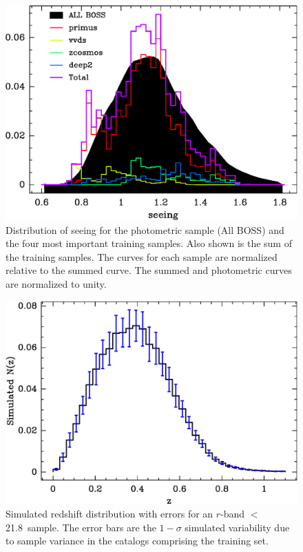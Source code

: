 \documentclass[preprint]{aastex}
\newcommand{\rmax}{21.8}
\begin{document}
\begin{figure}[h]\centering
    \includegraphics[scale=0.7]{figures/primus-vvds-zcosmos-deep2-match-seeing-10.eps}

    \caption{Distribution of seeing for the photometric sample (All BOSS) and
    the four most important training samples.  Also shown is the sum of the
    training samples.  The curves for each sample are normalized relative to
    the summed curve.  The summed and photometric curves are normalized to
    unity.}

    \label{fig:seeing}
\end{figure}

\begin{figure}[t]\centering
    \includegraphics[scale=0.7]{figures/nzsigf-edges-errblue.eps}

    \caption{Simulated redshift distribution with errors for an $r$-band $<$ \rmax\
    sample.  The error bars are the $1-\sigma$ simulated variability due to
    sample variance in the catalogs comprising the training set.}

    \label{fig:ebars}
    \vspace{2em}
\end{figure}
\end{document}
